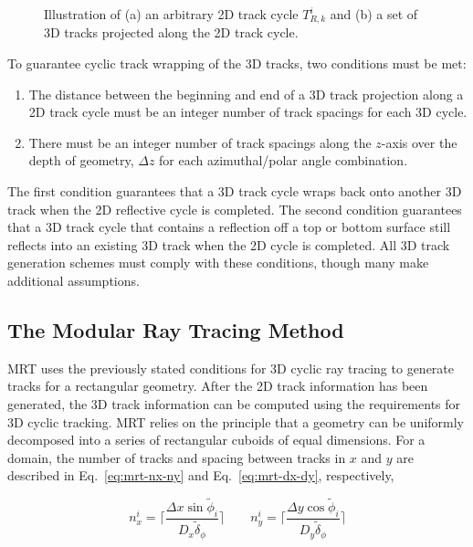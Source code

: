 \begin{figure}[h!]
\begin{subfigure}{0.45\textwidth}
		\caption{}
		\label{fig:projected-tracks-b}
	\end{subfigure}
	\caption[]{Illustration of (a) an arbitrary 2D track cycle $T_{R,k}^{i}$ and (b) a set of 3D tracks projected along the 2D track cycle.}
	\label{fig:projected-tracks}
\end{figure}


To guarantee cyclic track wrapping of the 3D tracks, two conditions must be met:

\begin{enumerate}
	\item The distance between the beginning and end of a 3D track projection along a 2D track cycle must be an integer number of track spacings for each 3D cycle.
	\item There must be an integer number of track spacings along the $z$-axis over the depth of geometry, $\Delta z$ for each azimuthal/polar angle combination.
\end{enumerate}

The first condition guarantees that a 3D track cycle wraps back onto another 3D track when the 2D reflective cycle is completed. The second condition guarantees that a 3D track cycle that contains a reflection off a top or bottom surface still reflects into an existing 3D track when the 2D cycle is completed. All 3D track generation schemes must comply with these conditions, though many make additional assumptions.

\subsection{The Modular Ray Tracing Method}

\ac{MRT} uses the previously stated conditions for 3D cyclic ray tracing to generate tracks for a rectangular geometry. After the 2D track information has been generated, the 3D track information can be computed using the requirements for 3D cyclic tracking. \ac{MRT} relies on the principle that a geometry can be uniformly decomposed into a series of rectangular cuboids of equal dimensions. For a domain, the number of tracks and spacing between tracks in $x$ and $y$ are described in Eq.~\ref{eq:mrt-nx-ny} and Eq.~\ref{eq:mrt-dx-dy}, respectively,

\begin{equation}
n_x^i = \Bigg\lceil\frac{\Delta x\sin{\tilde{\phi}_i}}{D_x \tilde{\delta}_\phi}\Bigg\rceil \qquad n_y^i = \Bigg\lceil\frac{\Delta y \cos{\tilde{\phi}_i}}{D_y \tilde{\delta}_\phi} \Bigg\rceil
\label{eq:mrt-nx-ny}
\end{equation}

